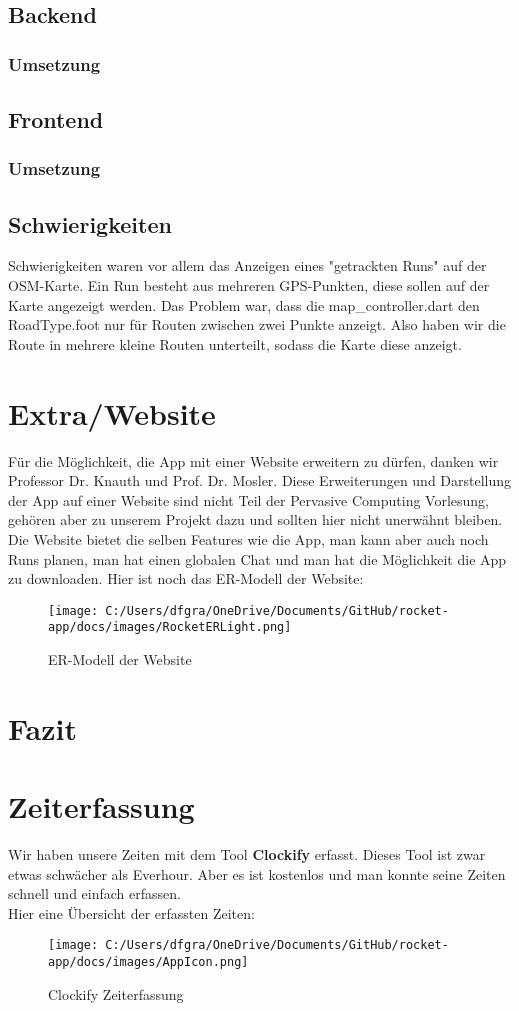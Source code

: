 \documentclass[11pt,a4paper]{article}
\begin{document}
\subsection{Backend}
\subsubsection{Umsetzung}
\subsection{Frontend}
\subsubsection{Umsetzung}
\subsection{Schwierigkeiten}
Schwierigkeiten waren vor allem das Anzeigen eines "getrackten Runs" auf der OSM-Karte. Ein Run besteht aus mehreren GPS-Punkten, diese sollen auf der Karte angezeigt werden.
Das Problem war, dass die map_controller.dart den RoadType.foot nur für Routen zwischen zwei Punkte anzeigt. Also haben wir die Route in mehrere kleine Routen unterteilt, sodass die Karte diese anzeigt.\\
\section{Extra/Website}
Für die Möglichkeit, die App mit einer Website erweitern zu dürfen, danken wir Professor Dr. Knauth und Prof. Dr. Mosler.
Diese Erweiterungen und Darstellung der App auf einer Website sind nicht Teil der Pervasive Computing Vorlesung, gehören aber zu unserem Projekt dazu und sollten hier nicht unerwähnt bleiben.
Die Website bietet die selben Features wie die App, man kann aber auch noch Runs planen, man hat einen globalen Chat und man hat die Möglichkeit die App zu downloaden.
Hier ist noch das ER-Modell der Website:
\begin{figure}[h]
    \centering
    \texttt{[image: C:/Users/dfgra/OneDrive/Documents/GitHub/rocket-app/docs/images/RocketERLight.png]}
    \caption{ER-Modell der Website}
    \label{fig:er-model-website}
\end{figure}
\section{Fazit}
\section{Zeiterfassung}
Wir haben unsere Zeiten mit dem Tool \textbf{Clockify} erfasst. Dieses Tool ist zwar etwas schwächer als Everhour. Aber es ist kostenlos und man konnte seine Zeiten schnell und einfach erfassen.\\
Hier eine Übersicht der erfassten Zeiten:
\begin{figure}[h]
    \centering
    \texttt{[image: C:/Users/dfgra/OneDrive/Documents/GitHub/rocket-app/docs/images/AppIcon.png]}
    \caption{Clockify Zeiterfassung}
    \label{fig:clockify}
\end{figure}
\end{document}
